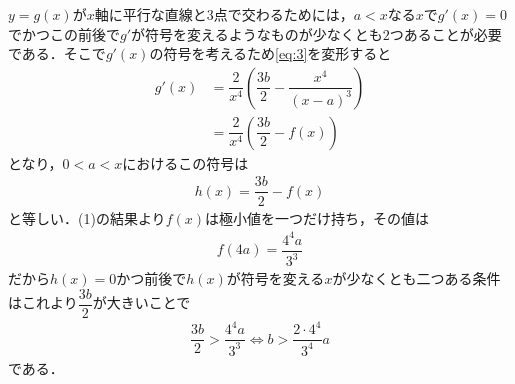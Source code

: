 \documentclass[../../main.tex]{subfiles}
\begin{document}
$y=g(x)$が$x$軸に平行な直線と3点で交わるためには，$a<x$なる$x$で$g'(x)=0$でかつこの前後で$g'$が符号を変えるようなものが少なくとも$2$つあることが必要である．そこで$g'(x)$の符号を考えるため\cref{eq:3}を変形すると
\begin{align}
  g'(x)
  &= \dfrac{2}{x^4}\left(\dfrac{3b}{2} - \dfrac{x^4}{(x-a)^3} \right) \\
  &=  \dfrac{2}{x^4}\left(\dfrac{3b}{2} - f(x) \right) \label{eq:4}
\end{align}
となり，$0<a<x$におけるこの符号は
\begin{align}
  h(x) = \dfrac{3b}{2} - f(x)
\end{align}
と等しい．(1)の結果より$f(x)$は極小値を一つだけ持ち，その値は
\begin{align}
  f\left(4a\right) = \dfrac{4^4 a}{3^3}
\end{align}
だから$h(x)=0$かつ前後で$h(x)$が符号を変える$x$が少なくとも二つある条件はこれより$\dfrac{3b}{2}$が大きいことで
\begin{align}
  \dfrac{3b}{2} > \dfrac{4^4 a}{3^3} \iff  b > \dfrac{2\cdot 4^4}{3^4}a \label{eq:5}
\end{align}
である．
\end{document}
